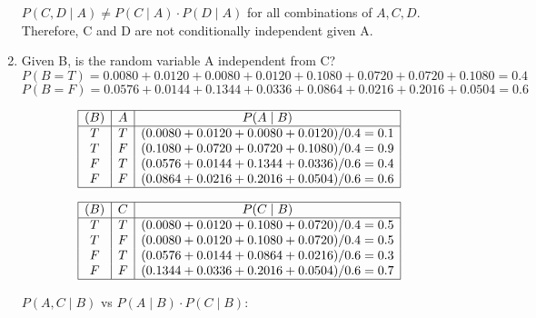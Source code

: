 \documentclass[12pt]{article}
\begin{document}
\begin{enumerate}[font=\Large,label=(\alph*)]
	      $ P(C, D \mid A) \neq P(C \mid A) \cdot P(D \mid A) $ for all combinations of $A,C,D$. Therefore, C and D are not conditionally independent given A.
	      \newpage
	\item Given B, is the random variable A independent from C?
	      $$ P(B = T) = 0.0080 + 0.0120 + 0.0080 + 0.0120 + 0.1080 + 0.0720 + 0.0720 + 0.1080 = 0.4 $$
	      $$ P(B = F) = 0.0576 + 0.0144 + 0.1344 + 0.0336 + 0.0864 + 0.0216 + 0.2016 + 0.0504 = 0.6 $$

	      $$
		      \begin{array}{|c|c|c|}
			      \hline
			      (B) & A & P(A \mid B)                                 \\
			      \hline
			      T   & T & (0.0080+0.0120+0.0080+0.0120)/0.4=0.1       \\
			      T   & F & (0.1080 + 0.0720 + 0.0720 + 0.1080)/0.4=0.9 \\
			      F   & T & (0.0576 + 0.0144 + 0.1344 + 0.0336)/0.6=0.4 \\
			      F   & F & (0.0864 + 0.0216 + 0.2016 + 0.0504)/0.6=0.6 \\
			      \hline
		      \end{array}
	      $$

	      $$
		      \begin{array}{|c|c|c|}
			      \hline
			      (B) & C & P(C \mid B)                               \\
			      \hline
			      T   & T & (0.0080 + 0.0120+0.1080 + 0.0720)/0.4=0.5 \\
			      T   & F & (0.0080 + 0.0120+0.1080 + 0.0720)/0.4=0.5 \\
			      F   & T & (0.0576 + 0.0144+0.0864 + 0.0216)/0.6=0.3 \\
			      F   & F & (0.1344 + 0.0336+0.2016 + 0.0504)/0.6=0.7 \\
			      \hline
		      \end{array}
	      $$

	      $ P(A, C \mid B) $ vs $ P(A \mid B) \cdot P(C \mid B) $:


\end{enumerate}
\end{document}
